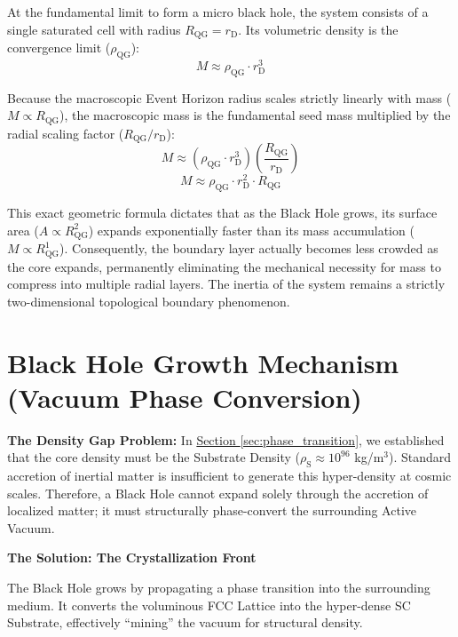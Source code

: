At the fundamental limit to form a micro black hole, the system consists of a single saturated cell with radius $R_{\mathrm{QG}} = r_{\mathrm{D}}$. Its volumetric density is the convergence limit ($\rho_{\mathrm{QG}}$):
\begin{equation}
    M \approx \rho_{\mathrm{QG}} \cdot r_{\mathrm{D}}^3
\end{equation}

Because the macroscopic Event Horizon radius scales strictly linearly with mass ($M \propto R_{\mathrm{QG}}$), the macroscopic mass is the fundamental seed mass multiplied by the radial scaling factor ($R_{\mathrm{QG}}/r_{\mathrm{D}}$):
\begin{equation}
    M \approx (\rho_{\mathrm{QG}} \cdot r_{\mathrm{D}}^3) \left( \frac{R_{\mathrm{QG}}}{r_{\mathrm{D}}} \right)
\end{equation}
\begin{equation}
    M \approx \rho_{\mathrm{QG}} \cdot r_{\mathrm{D}}^2 \cdot R_{\mathrm{QG}}
\end{equation}

This exact geometric formula dictates that as the Black Hole grows, its surface area ($A \propto R_{\mathrm{QG}}^2$) expands exponentially faster than its mass accumulation ($M \propto R_{\mathrm{QG}}^1$). Consequently, the boundary layer actually becomes less crowded as the core expands, permanently eliminating the mechanical necessity for mass to compress into multiple radial layers. The inertia of the system remains a strictly two-dimensional topological boundary phenomenon.

\section{Black Hole Growth Mechanism (Vacuum Phase Conversion)}

\textbf{The Density Gap Problem:} In \hyperref[sec:phase_transition]{Section \ref*{sec:phase_transition}}, we established that the core density must be the Substrate Density ($\rho_{\mathrm{S}} \approx 10^{96}$ kg/m$^3$). Standard accretion of inertial matter is insufficient to generate this hyper-density at cosmic scales. Therefore, a Black Hole cannot expand solely through the accretion of localized matter; it must structurally phase-convert the surrounding Active Vacuum.

\vspace{0.5em}
\noindent\textbf{The Solution: The Crystallization Front}

The Black Hole grows by propagating a phase transition into the surrounding medium. It converts the voluminous FCC Lattice into the hyper-dense SC Substrate, effectively ``mining'' the vacuum for structural density.

